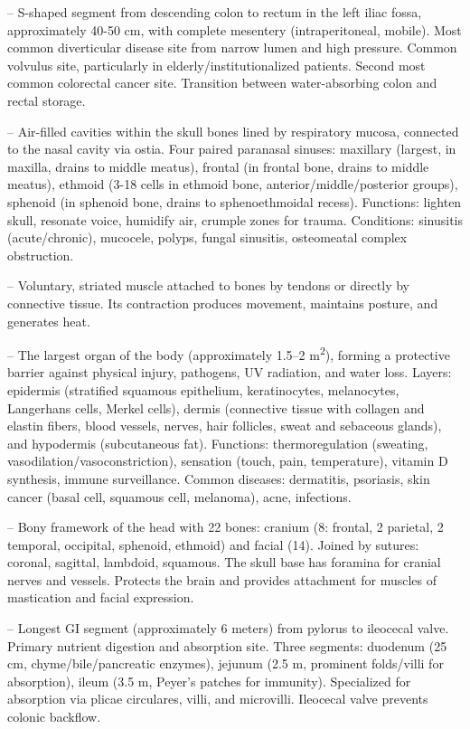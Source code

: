 -- S-shaped segment from descending colon to rectum in the left iliac fossa, approximately 40-50 cm, with complete mesentery (intraperitoneal, mobile). Most common diverticular disease site from narrow lumen and high pressure. Common volvulus site, particularly in elderly/institutionalized patients. Second most common colorectal cancer site. Transition between water-absorbing colon and rectal storage.

-- Air-filled cavities within the skull bones lined by respiratory mucosa, connected to the nasal cavity via ostia. Four paired paranasal sinuses: maxillary (largest, in maxilla, drains to middle meatus), frontal (in frontal bone, drains to middle meatus), ethmoid (3-18 cells in ethmoid bone, anterior/middle/posterior groups), sphenoid (in sphenoid bone, drains to sphenoethmoidal recess). Functions: lighten skull, resonate voice, humidify air, crumple zones for trauma. Conditions: sinusitis (acute/chronic), mucocele, polyps, fungal sinusitis, osteomeatal complex obstruction.

-- Voluntary, striated muscle attached to bones by tendons or directly by connective tissue. Its contraction produces movement, maintains posture, and generates heat.

-- The largest organ of the body (approximately 1.5--2 m\textsuperscript{2}), forming a protective barrier against physical injury, pathogens, UV radiation, and water loss. Layers: epidermis (stratified squamous epithelium, keratinocytes, melanocytes, Langerhans cells, Merkel cells), dermis (connective tissue with collagen and elastin fibers, blood vessels, nerves, hair follicles, sweat and sebaceous glands), and hypodermis (subcutaneous fat). Functions: thermoregulation (sweating, vasodilation/vasoconstriction), sensation (touch, pain, temperature), vitamin D synthesis, immune surveillance. Common diseases: dermatitis, psoriasis, skin cancer (basal cell, squamous cell, melanoma), acne, infections.

-- Bony framework of the head with 22 bones: cranium (8: frontal, 2 parietal, 2 temporal, occipital, sphenoid, ethmoid) and facial (14). Joined by sutures: coronal, sagittal, lambdoid, squamous. The skull base has foramina for cranial nerves and vessels. Protects the brain and provides attachment for muscles of mastication and facial expression.

-- Longest GI segment (approximately 6 meters) from pylorus to ileocecal valve. Primary nutrient digestion and absorption site. Three segments: duodenum (25 cm, chyme/bile/pancreatic enzymes), jejunum (2.5 m, prominent folds/villi for absorption), ileum (3.5 m, Peyer's patches for immunity). Specialized for absorption via plicae circulares, villi, and microvilli. Ileocecal valve prevents colonic backflow.


